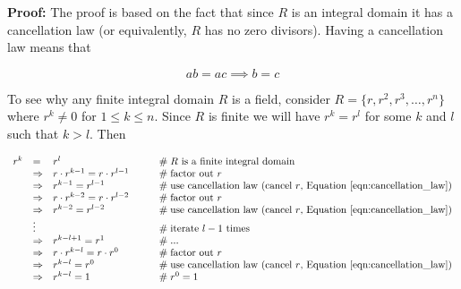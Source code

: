 \documentclass[11pt, oneside]{article}   	%
\theoremstyle{definition}
\begin{document}
\bigskip
\noindent
\textbf{Proof:}  The proof is based on the fact that since $R$ is an integral domain it has a cancellation law (or equivalently, $R$ has no zero divisors). 
Having a cancellation law means that

\begin{equation}
ab = ac \implies b = c
\label{eqn:cancellation_law}
\end{equation}


\bigskip
\noindent
To see why any finite integral domain $R$ is a field, consider $R = \{r, r^2, r^3, \hdots, r^n\}$  where 
$r^k \neq 0$ for $1 \leq k \leq n$.  Since $R$ is finite we will have $r^k = r^l$ for some $k$ and $l$ such that $k > l$. Then

\bigskip
\begin{equation*}
\begin{array}{rlll} 
r^k 
&=& r^l                                                                                        &    \qquad \mathrel{\#} \text{$R$ is a finite integral domain}        \\
&\Rightarrow& r \cdot r^{k-1} = r \cdot r^{l -1}                             &    \qquad \mathrel{\#} \text{factor out $r$}                                  \\
&\Rightarrow& r^{k-1} = r^{l -1}                                                   &    \qquad\mathrel{\#} \text{use cancellation law (cancel $r$, Equation \ref{eqn:cancellation_law}})    \\
&\Rightarrow& r \cdot r^{k-2} = r \cdot r^{l -2}                             &    \qquad\mathrel{\#} \text{factor out $r$}                                   \\
&\Rightarrow& r^{k-2} = r^{l -2}                                                   &    \qquad\mathrel{\#} \text{use cancellation law (cancel $r$, Equation \ref{eqn:cancellation_law})}  \\
&\vdots                                                                                        && \qquad\mathrel{\#} \text{iterate $l - 1$ times}                          \\    
&\Rightarrow& r^{k - l + 1} = r^1                                                 &     \qquad\mathrel{\#} \text{...}                                                    \\       
&\Rightarrow& r \cdot r^{k - l} = r \cdot r^0                                 &     \qquad\mathrel{\#} \text{factor out $r$}                                   \\    
&\Rightarrow& r^{k-l} = r^{0}                                                       &    \qquad\mathrel{\#} \text{use cancellation law (cancel $r$, Equation \ref{eqn:cancellation_law})}   \\   
&\Rightarrow& r^{k-l} = 1                                                            &     \qquad\mathrel{\#} r^0 = 1
\end{array}
\end{equation*}
\end{document}
